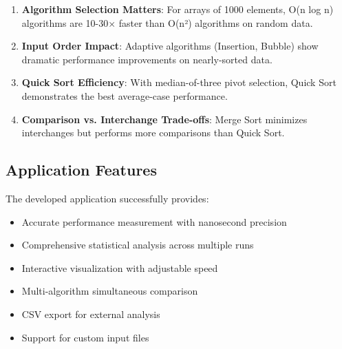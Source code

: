 \documentclass[12pt,a4paper]{article}
\begin{document}
\begin{enumerate}
    \item \textbf{Algorithm Selection Matters}: For arrays of 1000 elements, O(n log n) algorithms are 10-30× faster than O(n²) algorithms on random data.
    
    \item \textbf{Input Order Impact}: Adaptive algorithms (Insertion, Bubble) show dramatic performance improvements on nearly-sorted data.
    
    \item \textbf{Quick Sort Efficiency}: With median-of-three pivot selection, Quick Sort demonstrates the best average-case performance.
    
    \item \textbf{Comparison vs. Interchange Trade-offs}: Merge Sort minimizes interchanges but performs more comparisons than Quick Sort.
\end{enumerate}

\subsection{Application Features}

The developed application successfully provides:

\begin{itemize}
    \item Accurate performance measurement with nanosecond precision
    \item Comprehensive statistical analysis across multiple runs
    \item Interactive visualization with adjustable speed
    \item Multi-algorithm simultaneous comparison
    \item CSV export for external analysis
    \item Support for custom input files
\end{itemize}
\end{document}
